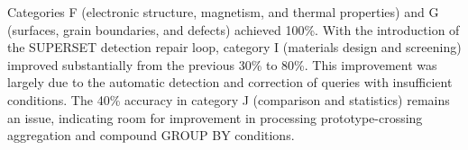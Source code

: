 \documentclass[5p,twocolumn]{elsarticle}
\begin{document}
Categories F (electronic structure, magnetism, and thermal properties) and G (surfaces, grain boundaries, and defects) achieved 100\%.
With the introduction of the SUPERSET detection repair loop, category I (materials design and screening)
improved substantially from the previous 30\% to 80\%.
This improvement was largely due to the automatic detection and correction of queries with insufficient conditions.
The 40\% accuracy in category J (comparison and statistics) remains an issue,
indicating room for improvement in processing prototype-crossing aggregation and compound GROUP BY conditions.
\end{document}
